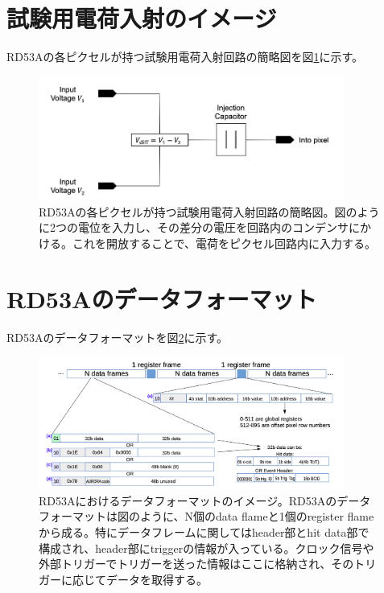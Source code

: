 \section{試験用電荷入射のイメージ}
RD53Aの各ピクセルが持つ試験用電荷入射回路の簡略図を図\ref{injection_circuit}に示す。
\begin{figure}[bpt]\centering
\includegraphics[width=10cm]{./injection_circuit.png}
\caption[RD53Aの各ピクセルが持つ試験用電荷入射回路の簡略図]{RD53Aの各ピクセルが持つ試験用電荷入射回路の簡略図\cite{b-1}。図のように2つの電位を入力し、その差分の電圧を回路内のコンデンサにかける。これを開放することで、電荷をピクセル回路内に入力する。}
\label{injection_circuit}
\end{figure}

\section{RD53Aのデータフォーマット}
RD53Aのデータフォーマットを図\ref{RD53A_data_format}に示す。
\begin{figure}[bpt]\centering
\includegraphics[width=10cm]{./RD53A_data_format.png}
\caption[RD53Aにおけるデータフォーマットのイメージ図]{RD53Aにおけるデータフォーマットのイメージ\cite{2-1}。RD53Aのデータフォーマットは図のように、N個のdata flameと1個のregister flameから成る。特にデータフレームに関してはheader部とhit data部で構成され、header部にtriggerの情報が入っている。クロック信号や外部トリガーでトリガーを送った情報はここに格納され、そのトリガーに応じてデータを取得する。}
\label{RD53A_data_format}
\end{figure}

